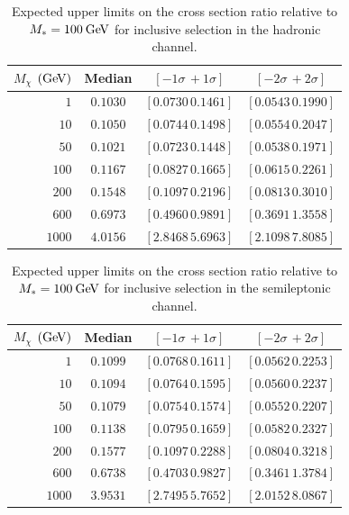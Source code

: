 \begin{table}[!ht]
\centering
\begin{tabular}{|r|c|c|c|}
\hline
  $M_\chi$ $(\mathrm{Ge\kern -0.1em V})$ & Median & $\left[-1\sigma\, +1\sigma\right]$ & $\left[-2\sigma\, +2\sigma\right]$ \\
\hline
  $1$               & $0.1030$ & $\left[0.0730\, 0.1461\right]$ & $\left[0.0543\, 0.1990\right]$ \\
  $10$              & $0.1050$ & $\left[0.0744\, 0.1498\right]$ & $\left[0.0554\, 0.2047\right]$ \\
  $50$              & $0.1021$ & $\left[0.0723\, 0.1448\right]$ & $\left[0.0538\, 0.1971\right]$ \\
  $100$             & $0.1167$ & $\left[0.0827\, 0.1665\right]$ & $\left[0.0615\, 0.2261\right]$ \\
  $200$             & $0.1548$ & $\left[0.1097\, 0.2196\right]$ & $\left[0.0813\, 0.3010\right]$ \\
  $600$             & $0.6973$ & $\left[0.4960\, 0.9891\right]$ & $\left[0.3691\, 1.3558\right]$ \\
  $1000$            & $4.0156$ & $\left[2.8468\, 5.6963\right]$ & $\left[2.1098\, 7.8085\right]$ \\
\hline
\end{tabular}
\caption{Expected upper limits on the cross section ratio relative to $M_*=100\:\mathrm{Ge\kern -0.1em V}$ for inclusive selection in the hadronic channel.}
\label{tab:rLimits_hadronic_count}
\end{table}

\begin{table}[!ht]
\centering
\begin{tabular}{|r|c|c|c|}
\hline
  $M_\chi$ $(\mathrm{Ge\kern -0.1em V})$ & Median & $\left[-1\sigma\, +1\sigma\right]$ & $\left[-2\sigma\, +2\sigma\right]$ \\
\hline
  $1$               & $0.1099$ & $\left[0.0768\, 0.1611\right]$ & $\left[0.0562\, 0.2253\right]$ \\
  $10$              & $0.1094$ & $\left[0.0764\, 0.1595\right]$ & $\left[0.0560\, 0.2237\right]$ \\
  $50$              & $0.1079$ & $\left[0.0754\, 0.1574\right]$ & $\left[0.0552\, 0.2207\right]$ \\
  $100$             & $0.1138$ & $\left[0.0795\, 0.1659\right]$ & $\left[0.0582\, 0.2327\right]$ \\
  $200$             & $0.1577$ & $\left[0.1097\, 0.2288\right]$ & $\left[0.0804\, 0.3218\right]$ \\
  $600$             & $0.6738$ & $\left[0.4703\, 0.9827\right]$ & $\left[0.3461\, 1.3784\right]$ \\
  $1000$            & $3.9531$ & $\left[2.7495\, 5.7652\right]$ & $\left[2.0152\, 8.0867\right]$ \\
\hline
\end{tabular}
\caption{Expected upper limits on the cross section ratio relative to $M_*=100\:\mathrm{Ge\kern -0.1em V}$ for inclusive selection in the semileptonic channel.}
\label{tab:rLimits_semilept_count}
\end{table}

